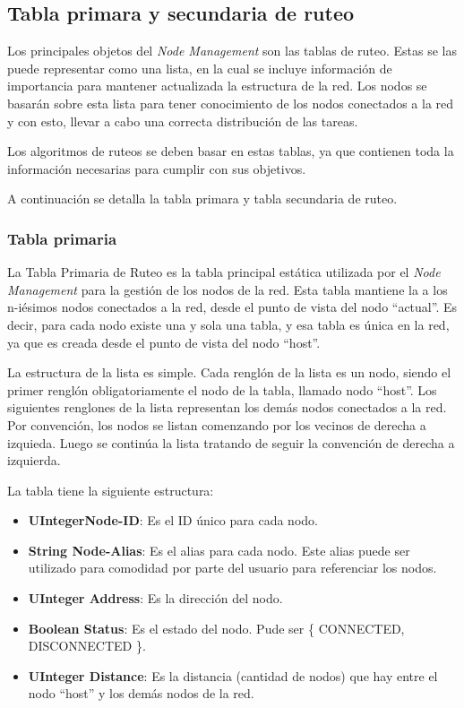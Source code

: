 \subsection{Tabla primara y secundaria de ruteo}
Los principales objetos del \textit{Node Management} son las tablas de ruteo.
Estas se las puede representar como una lista, en la cual se incluye
información de importancia para mantener actualizada la estructura de la red.
Los nodos se basarán sobre esta lista para tener conocimiento de los nodos
conectados a la red y con esto, llevar a cabo una correcta distribución de las
tareas.

Los algoritmos de ruteos se deben basar en estas tablas, ya que contienen toda
la información necesarias para cumplir con sus objetivos.

A continuación se detalla la tabla primara y tabla secundaria de ruteo.

\subsubsection{Tabla primaria}
La Tabla Primaria de Ruteo es la tabla principal estática utilizada por el
\textit{Node Management} para la gestión de los nodos de la red. Esta tabla
mantiene la a los n-iésimos nodos conectados a la red, desde el punto de vista
del nodo ``actual''. Es decir, para cada nodo existe una y sola una tabla, y esa
tabla es única en la red, ya que es creada desde el punto de vista del nodo
``host''.

La estructura de la lista es simple. Cada renglón de la lista es un nodo, siendo
el primer renglón obligatoriamente el nodo de la tabla, llamado nodo ``host''.
Los siguientes renglones de la lista representan los demás nodos conectados a la
red. Por convención, los nodos se listan comenzando por los vecinos de derecha a
izquieda. Luego se continúa la lista tratando de seguir la convención de derecha
a izquierda.

La tabla tiene la siguiente estructura:
\begin{itemize}
\item \textbf{UIntegerNode-ID}: Es el ID único para cada nodo. 
\item \textbf{String Node-Alias}: Es el alias para cada nodo. Este alias puede
  ser utilizado para comodidad por parte del usuario para referenciar los nodos.
\item \textbf{UInteger Address}: Es la dirección del nodo.  
\item \textbf{Boolean Status}: Es el estado del nodo. Pude ser \{ CONNECTED,
  DISCONNECTED \}.
\item \textbf{UInteger Distance}: Es la distancia (cantidad de nodos) que hay
  entre el nodo  ``host'' y los demás nodos de la red. 
\end{itemize}

